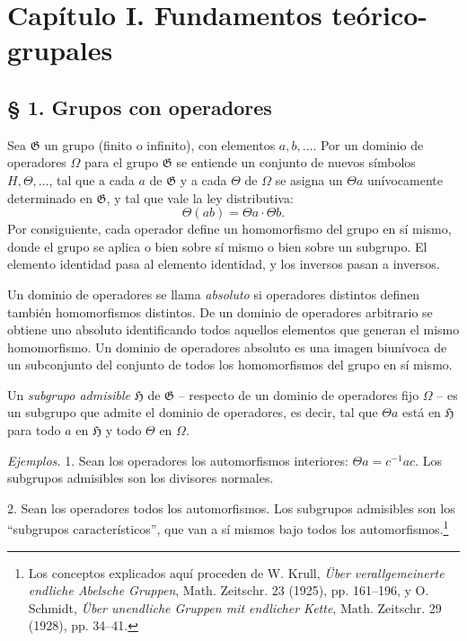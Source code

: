 \documentclass[11pt]{article}
\providecommand{\mG}{\mathfrak{G}}
\providecommand{\mH}{\mathfrak{H}}
\begin{document}
\section*{Capítulo I. Fundamentos teórico-grupales}

\subsection*{§ 1. Grupos con operadores}

Sea $\mG$ un grupo (finito o infinito), con elementos $a,b,\ldots$. Por un dominio de operadores $\Omega$ para el grupo $\mG$ se entiende un conjunto de nuevos símbolos $H,\Theta,\ldots$, tal que a cada $a$ de $\mG$ y a cada $\Theta$ de $\Omega$ se asigna un $\Theta a$ unívocamente determinado en $\mG$, y tal que vale la ley distributiva:
\[
        \Theta(ab)=\Theta a\cdot\Theta b.
\]
Por consiguiente, cada operador define un homomorfismo del grupo en sí mismo, donde el grupo se aplica o bien sobre sí mismo o bien sobre un subgrupo. El elemento identidad pasa al elemento identidad, y los inversos pasan a inversos.

Un dominio de operadores se llama \emph{absoluto} si operadores distintos definen también homomorfismos distintos. De un dominio de operadores arbitrario se obtiene uno absoluto identificando todos aquellos elementos que generan el mismo homomorfismo. Un dominio de operadores absoluto es una imagen biunívoca de un subconjunto del conjunto de todos los homomorfismos del grupo en sí mismo.

Un \emph{subgrupo admisible} $\mH$ de $\mG$ -- respecto de un dominio de operadores fijo $\Omega$ -- es un subgrupo que admite el dominio de operadores, es decir, tal que $\Theta a$ está en $\mH$ para todo $a$ en $\mH$ y todo $\Theta$ en $\Omega$.

\emph{Ejemplos.} 1. Sean los operadores los automorfismos interiores: $\Theta a=c^{-1}ac$. Los subgrupos admisibles son los divisores normales.

2. Sean los operadores todos los automorfismos. Los subgrupos admisibles son los ``subgrupos característicos'', que van a sí mismos bajo todos los automorfismos.\footnote{Los conceptos explicados aquí proceden de W. Krull, \emph{Über verallgemeinerte endliche Abelsche Gruppen}, Math. Zeitschr. 23 (1925), pp. 161--196, y O. Schmidt, \emph{Über unendliche Gruppen mit endlicher Kette}, Math. Zeitschr. 29 (1928), pp. 34--41.}
\end{document}
